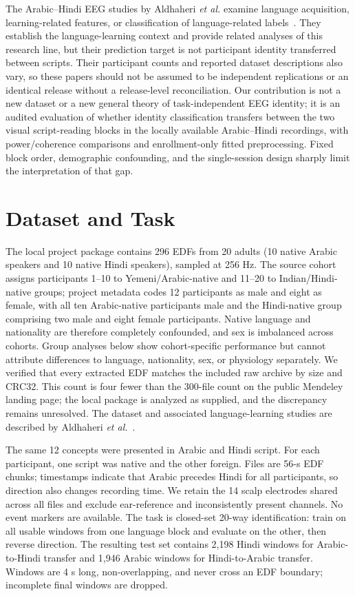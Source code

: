 \documentclass[conference]{IEEEtran}
\begin{document}
The Arabic--Hindi EEG studies by Aldhaheri \emph{et al.} examine language acquisition, learning-related features, or classification of language-related labels~\cite{aldhaheri2024,aldhaheri2025,aldhaheri2026}. They establish the language-learning context and provide related analyses of this research line, but their prediction target is not participant identity transferred between scripts. Their participant counts and reported dataset descriptions also vary, so these papers should not be assumed to be independent replications or an identical release without a release-level reconciliation. Our contribution is not a new dataset or a new general theory of task-independent EEG identity; it is an audited evaluation of whether identity classification transfers between the two visual script-reading blocks in the locally available Arabic--Hindi recordings, with power/coherence comparisons and enrollment-only fitted preprocessing. Fixed block order, demographic confounding, and the single-session design sharply limit the interpretation of that gap.

\section{Dataset and Task}
The local project package contains 296 EDFs from 20 adults (10 native Arabic speakers and 10 native Hindi speakers), sampled at 256 Hz. The source cohort assigns participants 1--10 to Yemeni/Arabic-native and 11--20 to Indian/Hindi-native groups; project metadata codes 12 participants as male and eight as female, with all ten Arabic-native participants male and the Hindi-native group comprising two male and eight female participants. Native language and nationality are therefore completely confounded, and sex is imbalanced across cohorts. Group analyses below show cohort-specific performance but cannot attribute differences to language, nationality, sex, or physiology separately. We verified that every extracted EDF matches the included raw archive by size and CRC32. This count is four fewer than the 300-file count on the public Mendeley landing page; the local package is analyzed as supplied, and the discrepancy remains unresolved. The dataset and associated language-learning studies are described by Aldhaheri \emph{et al.}~\cite{aldhaheri2024,aldhaheri2025,aldhaheri2026,dataset}.

The same 12 concepts were presented in Arabic and Hindi script. For each participant, one script was native and the other foreign. Files are 56-s EDF chunks; timestamps indicate that Arabic precedes Hindi for all participants, so direction also changes recording time. We retain the 14 scalp electrodes shared across all files and exclude ear-reference and inconsistently present channels. No event markers are available. The task is closed-set 20-way identification: train on all usable windows from one language block and evaluate on the other, then reverse direction. The resulting test set contains 2,198 Hindi windows for Arabic-to-Hindi transfer and 1,946 Arabic windows for Hindi-to-Arabic transfer. Windows are 4 s long, non-overlapping, and never cross an EDF boundary; incomplete final windows are dropped.
\end{document}
